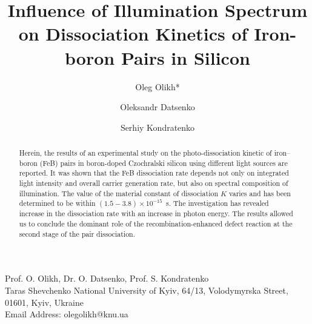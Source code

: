 \documentclass{WileyMSP-template}
\begin{document}
\pagestyle{fancy}


\title{Influence of Illumination Spectrum on Dissociation Kinetics of Iron-boron Pairs in Silicon}

\maketitle




\author{Oleg Olikh*}
\author{Oleksandr Datsenko}
\author{Serhiy Kondratenko}


\dedication{}






\begin{affiliations}
Prof. O. Olikh, Dr. O. Datsenko, Prof. S. Kondratenko\\
Taras Shevchenko National University of Kyiv, 64/13, Volodymyrska Street, 01601, Kyiv, Ukraine\\
Email Address: olegolikh@knu.ua


\end{affiliations}






\begin{abstract}

Herein, the results of an experimental study on the photo-dissociation kinetic of iron–boron (FeB) pairs
in boron-doped Czochralski silicon using different light sources are reported.
It was shown that the FeB dissociation rate depends not only on integrated light intensity
and overall carrier generation rate, but also on spectral composition of illumination.
The value of the material constant of dissociation $K$ varies and has been determined to be within $(1.5-3.8)\times10^{-15}$~s.
The investigation has revealed  increase in the dissociation rate with an increase in photon energy.
The results allowed us to conclude the dominant role of the recombination-enhanced defect reaction
at the second stage of the pair dissociation.

\end{abstract}
\end{document}
